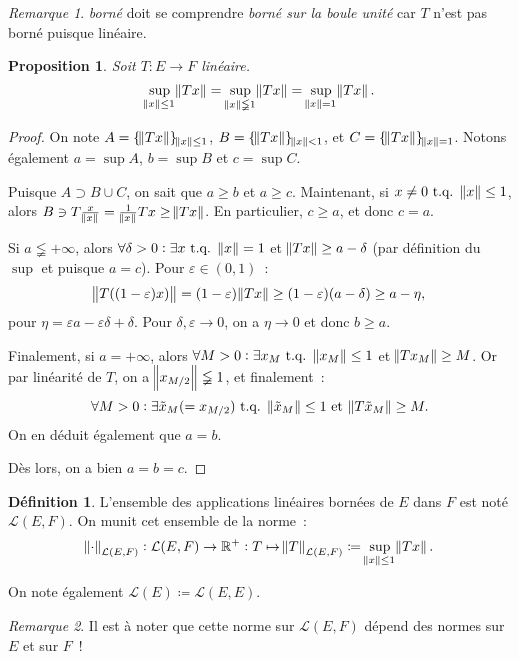 \documentclass{report}
\newcommand{\tq}{\text{ t.q. }}
\newcommand{\st}{\tq}
\newcommand{\pinfty}{{+\infty}}
\newtheorem{prp}[thm]{Proposition}
\theoremstyle{definition}
\newtheorem{déf}[thm]{Définition}
\theoremstyle{remark}
\newtheorem*{rmq}{Remarque}
\begin{document}
\begin{rmq} \textit{borné} doit se comprendre \textit{borné sur la boule unité} car $T$ n'est pas borné puisque linéaire.
\end{rmq}

\begin{prp} Soit $T : E \to F$ linéaire.
\[\sup_{\norm x \leq 1}\norm {Tx} = \sup_{\norm x \lneqq 1}\norm {Tx} = \sup_{\norm x = 1}\norm {Tx}.\]
\end{prp}

\begin{proof} On note $A = \{\norm {Tx}\}_{\norm x \leq 1}$, $B = \{\norm {Tx}\}_{\norm x < 1}$, et $C = \{\norm {Tx}\}_{\norm x = 1}$.
Notons également $a = \sup A$, $b = \sup B$ et $c = \sup C$.

Puisque $A \supset B \cup C$, on sait que $a \geq b$ et $a \geq c$. Maintenant, si $x \neq 0 \st \norm x \leq 1$, alors $B \ni T\frac x{\norm x} = \frac 1{\norm x}Tx \geq \norm {Tx}$.
En particulier, $c \geq a$, et donc $c=a$.

Si $a \lneqq \pinfty$, alors $\forall \delta > 0 : \exists x \st \norm x = 1$ et $\norm {Tx} \geq a-\delta$ (par définition du $\sup$ et puisque $a=c$). Pour $\varepsilon \in (0, 1)$~:
\[\norm {T((1-\varepsilon)x)} = (1-\varepsilon)\norm {Tx} \geq (1-\varepsilon)(a-\delta) \geq a-\eta,\]
pour $\eta = \varepsilon a - \varepsilon \delta + \delta$. Pour $\delta, \varepsilon \to 0$, on a $\eta \to 0$ et donc $b \geq a$.

Finalement, si $a = \pinfty$, alors $\forall M > 0 : \exists x_M \st \norm {x_M} \leq 1$ et $\norm {Tx_M} \geq M$. Or par linéarité de $T$, on a $\norm {x_{M/2}} \lneqq 1$,
et finalement~:
\[\forall M > 0 : \exists \tilde x_M (= x_{M/2}) \st \norm {\tilde x_M} \leq 1 \text{ et } \norm {T\tilde x_M} \geq M.\]
On en déduit également que $a=b$.

Dès lors, on a bien $a = b = c$.
\end{proof}

\begin{déf} L'ensemble des applications linéaires bornées de $E$ dans $F$ est noté $\mathcal L(E, F)$. On munit cet ensemble de la norme~:
\[\norm \cdot_{\mathcal L(E, F)} : \mathcal L(E, F) \to \mathbb R^+ : T \mapsto \norm T_{\mathcal L(E, F)} \coloneqq \sup_{\norm x \leq 1}\norm {Tx}.\]

On note également $\mathcal L(E) \coloneqq \mathcal L(E, E)$.
\end{déf}

\begin{rmq} Il est à noter que cette norme sur $\mathcal L(E, F)$ dépend des normes sur $E$ et sur $F$~!
\end{rmq}
\end{document}
